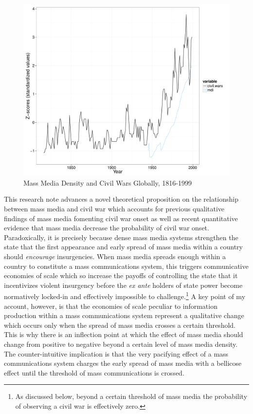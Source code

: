 \documentclass[12pt,article,oneside]{memoir}
\makeatletter
\def\maxwidth{\ifdim\Gin@nat@width>\linewidth\linewidth
\else\Gin@nat@width\fi}
\let\Oldincludegraphics\includegraphics
\renewcommand{\includegraphics}[1]{\Oldincludegraphics[width=\maxwidth]{#1}}
\makeatother
\begin{document}
\begin{figure}[htbp]
\centering
\includegraphics{media_civil_war_files/figure-markdown/globalplot.pdf}
\caption{Mass Media Density and Civil Wars Globally, 1816-1999}
\end{figure}

This research note advances a novel theoretical proposition on the
relationship between mass media and civil war which accounts for
previous qualitative findings of mass media fomenting civil war onset as
well as recent quantitative evidence that mass media decrease the
probability of civil war onset. Paradoxically, it is precisely because
dense mass media systems strengthen the state that the first appearance
and early spread of mass media within a country should \emph{encourage}
insurgencies. When mass media spreads enough within a country to
constitute a mass communications system, this triggers communicative
economies of scale which so increase the payoffs of controlling the
state that it incentivizes violent insurgency before the \emph{ex ante}
holders of state power become normatively locked-in and effectively
impossible to challenge.\footnote{As discussed below, beyond a certain
  threshold of mass media the probability of observing a civil war is
  effectively zero.} A key point of my account, however, is that the
economies of scale peculiar to information production within a mass
communications system represent a qualitative change which occurs only
when the spread of mass media crosses a certain threshold. This is why
there is an inflection point at which the effect of mass media should
change from positive to negative beyond a certain level of mass media
density. The counter-intuitive implication is that the very pacifying
effect of a mass communications system charges the early spread of mass
media with a bellicose effect until the threshold of mass communications
is crossed.
\end{document}
